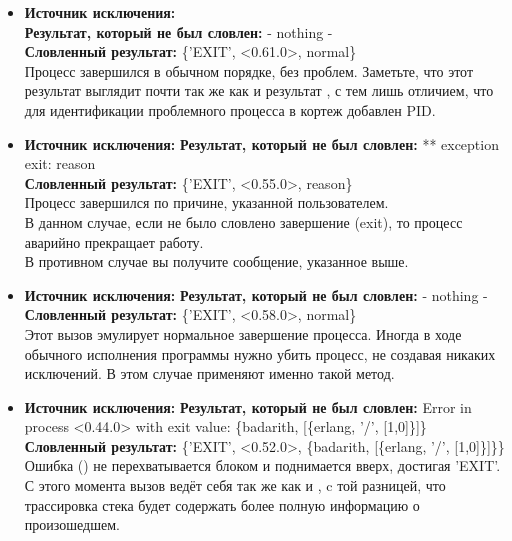 \begin{itemize}
    \item \textbf{Источник исключения:} \\
    \textbf{Результат, который не был словлен:} - nothing -\\
    \textbf{Словленный результат:} \{'EXIT', <0.61.0>, normal\}\\
    Процесс завершился в обычном порядке, без проблем.
    Заметьте, что этот результат выглядит почти так же как и результат , с тем лишь отличием, что для идентификации проблемного процесса в кортеж добавлен PID.\\
    \item \textbf{Источник исключения:} 
    \textbf{Результат, который не был словлен:} ** exception exit: reason\\
    \textbf{Словленный результат:} \{'EXIT', <0.55.0>, reason\}\\
    Процесс завершился по причине, указанной пользователем.\\
    В данном случае, если не было словлено завершение (exit), то процесс аварийно прекращает работу.\\
    В противном случае вы получите сообщение, указанное выше.\\
    \item \textbf{Источник исключения:} 
    \textbf{Результат, который не был словлен:} - nothing -\\
    \textbf{Словленный результат:} \{'EXIT', <0.58.0>, normal\}\\
    Этот вызов эмулирует нормальное завершение процесса.
    Иногда в ходе обычного  исполнения программы нужно убить процесс, не создавая никаких исключений.
    В этом  случае применяют именно такой метод.\\
    \item \textbf{Источник исключения:} 
    \textbf{Результат, который не был словлен:} Error in process <0.44.0> with exit value: \{badarith, [\{erlang, '/', [1,0]\}]\}\\
    \textbf{Словленный результат:} \{'EXIT', <0.52.0>, \{badarith, [\{erlang, '/', [1,0]\}]\}\}\\
    Ошибка () не перехватывается блоком  и поднимается вверх, достигая 'EXIT'.
    С этого момента вызов ведёт себя так же как и , c той разницей, что трассировка стека будет содержать более полную информацию о произошедшем.\\

\end{itemize}
